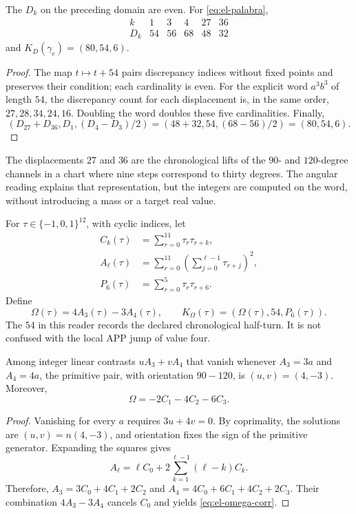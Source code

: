 \begin{lemma}
The \(D_k\) on the preceding domain are even. For
\eqref{eq:el-palabra},
\[
 \begin{array}{c|rrrrr}
 k&1&3&4&27&36\\\hline
 D_k&54&56&68&48&32
 \end{array}
\]
and \(K_D(\gamma_e)=(80,54,6)\).
\end{lemma}
\begin{proof}
The map \(t\mapsto t+54\) pairs discrepancy indices without fixed
points and preserves their condition; each cardinality is even. For the
explicit word \(a^3b^3\) of length \(54\), the discrepancy
count for each displacement is, in the same order,
\(27,28,34,24,16\). Doubling the word doubles these five cardinalities.
Finally,
\[
 (D_{27}+D_{36},D_1,(D_4-D_3)/2)
 =(48+32,54,(68-56)/2)=(80,54,6).
\]
\end{proof}

The displacements \(27\) and \(36\) are the chronological
lifts of the \(90\)- and \(120\)-degree channels in a chart
where nine steps correspond to thirty degrees. The angular reading
explains that representation, but the integers are computed on the
word, without introducing a mass or a target real value.

\begin{definition}
For \(\tau\in\{-1,0,1\}^{12}\), with cyclic indices, let
\begin{align*}
 C_k(\tau)&=\sum_{r=0}^{11}\tau_r\tau_{r+k},\\
 A_\ell(\tau)&=\sum_{r=0}^{11}
           \left(\sum_{j=0}^{\ell-1}\tau_{r+j}\right)^2,\\
 P_6(\tau)&=\sum_{r=0}^{5}\tau_r\tau_{r+6}.
\end{align*}
Define
\begin{equation}
 \Omega(\tau)=4A_3(\tau)-3A_4(\tau),\qquad
 K_\Omega(\tau)=(\Omega(\tau),54,P_6(\tau)).
 \label{eq:el-komega}
\end{equation}
The \(54\) in this reader records the declared chronological half-turn.
It is not confused with the local APP jump of value four.
\end{definition}

\begin{lemma}
Among integer linear contrasts \(uA_3+vA_4\) that vanish
whenever \(A_3=3a\) and \(A_4=4a\), the primitive pair, with
orientation \(90-120\), is \((u,v)=(4,-3)\). Moreover,
\begin{equation}
 \Omega=-2C_1-4C_2-6C_3.
 \label{eq:el-omega-corr}
\end{equation}
\end{lemma}
\begin{proof}
Vanishing for every \(a\) requires \(3u+4v=0\). By coprimality,
the solutions are \((u,v)=n(4,-3)\), and orientation fixes the sign
of the primitive generator. Expanding the squares gives
\[
 A_\ell=\ell C_0+2\sum_{k=1}^{\ell-1}(\ell-k)C_k.
\]
Therefore,
\(A_3=3C_0+4C_1+2C_2\) and
\(A_4=4C_0+6C_1+4C_2+2C_3\). Their combination \(4A_3-3A_4\)
cancels \(C_0\) and yields \eqref{eq:el-omega-corr}.
\end{proof}

